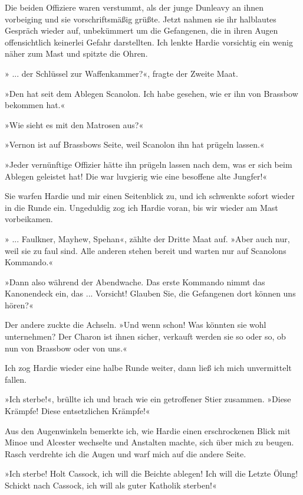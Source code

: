 Die beiden Offiziere waren verstummt, als der junge Dunleavy an
ihnen vorbeiging und sie vorschriftsmäßig grüßte. Jetzt nahmen sie
ihr halblautes Gespräch wieder auf, unbekümmert um die Gefangenen,
die in ihren Augen offensichtlich keinerlei Gefahr darstellten. Ich
lenkte Hardie vorsichtig ein wenig näher zum Mast und spitzte die
Ohren.

» ... der Schlüssel zur Waffenkammer?«, fragte der Zweite Maat.

»Den hat seit dem Ablegen Scanolon. Ich habe gesehen, wie er ihn
von Brassbow bekommen hat.«

»Wie sieht es mit den Matrosen aus?«

»Vernon ist auf Brassbows Seite, weil Scanolon ihn hat prügeln
lassen.«

»Jeder vernünftige Offizier hätte ihn prügeln lassen nach dem, was
er sich beim Ablegen geleistet hat! Die  war
luvgierig wie eine besoffene alte Jungfer!«

Sie warfen Hardie und mir einen Seitenblick zu, und ich schwenkte
sofort wieder in die Runde ein. Ungeduldig zog ich Hardie voran,
bis wir wieder am Mast vorbeikamen.

» ... Faulkner, Mayhew, Spehan«, zählte der Dritte Maat auf. »Aber
auch nur, weil sie zu faul sind. Alle anderen stehen bereit und
warten nur auf Scanolons Kommando.«

»Dann also während der Abendwache. Das erste Kommando nimmt das
Kanonendeck ein, das ... Vorsicht! Glauben Sie, die Gefangenen dort
können uns hören?«

Der andere zuckte die Achseln. »Und wenn schon! Was könnten sie
wohl unternehmen? Der Charon ist ihnen sicher, verkauft werden sie
so oder so, ob nun von Brassbow oder von uns.«

Ich zog Hardie wieder eine halbe Runde weiter, dann ließ ich mich
unvermittelt fallen.

\bigpar

»Ich sterbe!«, brüllte ich und brach wie ein getroffener Stier
zusammen. »Diese Krämpfe! Diese entsetzlichen Krämpfe!«

Aus den Augenwinkeln bemerkte ich, wie Hardie einen erschrockenen
Blick mit Minoe und Alcester wechselte und Anstalten machte, sich
über mich zu beugen. Rasch verdrehte ich die Augen und warf mich
auf die andere Seite.

»Ich sterbe! Holt Cassock, ich will die Beichte ablegen! Ich will
die Letzte Ölung! Schickt nach Cassock, ich will als guter Katholik
sterben!«

